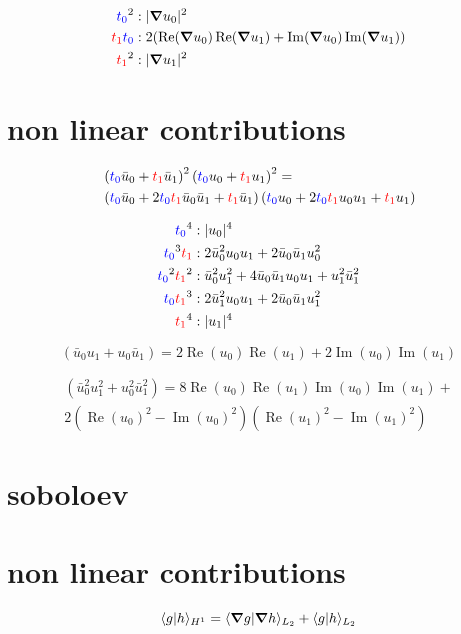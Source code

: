 \documentclass[12pt,a4paper]{article}
\newcommand{\RE}{\ensuremath{\operatorname{Re}}}
\newcommand{\IM}{\ensuremath{\operatorname{Im}}}
\newcommand{\fz}{\ensuremath{{\color{blue}t_0}}}
\newcommand{\fo}{\ensuremath{{\color{red}t_1}}}
\begin{document}
\begin{align}
\fz^2  &: \vert \grad u_0 \vert^2 \\
\fo\fz &: 2 ( \RE(\grad u_0) \RE(\grad u_1) + \IM(\grad u_0) \IM(\grad u_1) ) \\
\fo^2  &: \vert \grad u_1 \vert^2
\end{align}

\section{non linear contributions}

\begin{align}
&\left( \fz \bar{u}_0 + \fo \bar{u}_1 \right)^2 \left( \fz u_0 + \fo u_1 \right)^2 = \\
&\left( \fz \bar{u}_0 + 2 \fz \fo \bar{u}_0 \bar{u}_1 + \fo \bar{u}_1 \right) \left( \fz u_0 + 2 \fz \fo u_0 u_1 + \fo u_1 \right)
\end{align}

\begin{align}
\fz^4 &: \vert u_0 \vert^4 \\
\fz^3 \fo &: 2 \bar{u}_0^2 u_0 u_1 + 2 \bar{u}_0 \bar{u}_1 u_0^2 \\
\fz^2 \fo^2 &: \bar{u}_0^2 u_1^2 + 4 \bar{u}_0 \bar{u}_1 u_0 u_1 + u_1^2 \bar{u}_1^2 \\
\fz \fo^3  &: 2 \bar{u}_1^2 u_0 u_1 + 2 \bar{u}_0 \bar{u}_1 u_1^2 \\
\fo^4 &: \vert u_1 \vert^4
\end{align}

\begin{equation}
( \bar{u}_0 u_1 + u_0 \bar{u}_1 ) = 2 \RE(u_0) \RE(u_1) + 2 \IM(u_0) \IM(u_1)
\end{equation}

\begin{multline}
( \bar{u}_0^2 u_1^2 + u_0^2 \bar{u}_1^2 ) = 8 \RE(u_0) \RE(u_1) \IM(u_0) \IM(u_1) + \\ 2 (\RE(u_0)^2 - \IM(u_0)^2) (\RE(u_1)^2 - \IM(u_1)^2)
\end{multline}

\section{soboloev}

\section{non linear contributions}

\begin{equation}
\langle g | h \rangle_{H^1} = \langle \grad g | \grad h \rangle_{L_2} + \langle g | h \rangle_{L_2} 
\end{equation}
\end{document}
